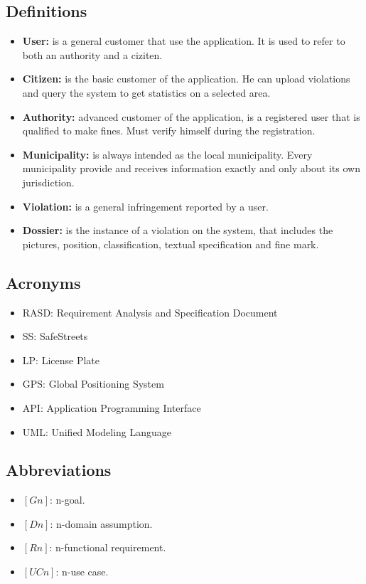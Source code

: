 \documentclass[../RASD.tex]{subfiles}
\begin{document}
    \subsection{Definitions}\label{subsec:definitions}
    \begin{itemize}
        \item \textbf{User:} is a general customer that use the application. It is used to refer to both an authority and a ciziten.
        \item \textbf{Citizen:} is the basic customer of the application. He can upload violations and query the system to get statistics on a selected area.
        \item \textbf{Authority:} advanced customer of the application, is a registered user that is qualified to make fines. Must verify himself during the registration.
        \item \textbf{Municipality:} is always intended as the local municipality. Every municipality provide and receives information exactly and only about its own jurisdiction.
        \item \textbf{Violation:} is a general infringement reported by a user.
        \item  \textbf{Dossier:} is the instance of a violation on the system, that includes the pictures, position, classification, textual specification and fine mark.
    \end{itemize}

    \subsection{Acronyms}\label{subsec:acronyms}
    \begin{itemize}
        \item RASD: Requirement Analysis and Specification Document
        \item SS: SafeStreets
        \item LP: License Plate
        \item GPS: Global Positioning System
        \item API: Application Programming Interface
        \item UML: Unified Modeling Language
    \end{itemize}

    \subsection{Abbreviations}\label{subsec:abbreviations}
    \begin{itemize}
        \item $[Gn]$: n-goal.
        \item $[Dn]$: n-domain assumption.
        \item $[Rn]$: n-functional requirement.
        \item $[UCn]$: n-use case.
    \end{itemize}
\end{document}
